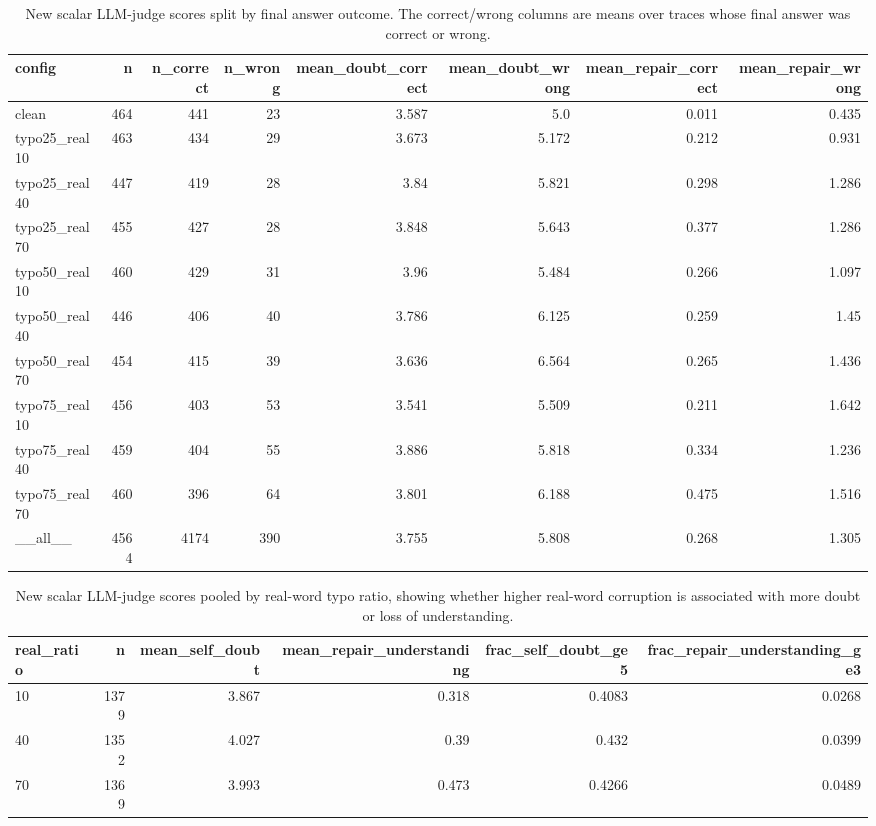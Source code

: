\documentclass[11pt]{article}
\begin{document}
\begin{table}[H]
\centering
\caption{New scalar LLM-judge scores split by final answer outcome. The correct/wrong columns are means over traces whose final answer was correct or wrong.}
\small
\begin{adjustbox}{max width=\textwidth}
\begin{tabular}{lrrrrrrr}
\toprule
\textbf{config} & \textbf{n} & \textbf{n\_correct} & \textbf{n\_wrong} & \textbf{mean\_doubt\_correct} & \textbf{mean\_doubt\_wrong} & \textbf{mean\_repair\_correct} & \textbf{mean\_repair\_wrong} \\
\midrule
clean & 464 & 441 & 23 & 3.587 & 5.0 & 0.011 & 0.435 \\
typo25\_real10 & 463 & 434 & 29 & 3.673 & 5.172 & 0.212 & 0.931 \\
typo25\_real40 & 447 & 419 & 28 & 3.84 & 5.821 & 0.298 & 1.286 \\
typo25\_real70 & 455 & 427 & 28 & 3.848 & 5.643 & 0.377 & 1.286 \\
typo50\_real10 & 460 & 429 & 31 & 3.96 & 5.484 & 0.266 & 1.097 \\
typo50\_real40 & 446 & 406 & 40 & 3.786 & 6.125 & 0.259 & 1.45 \\
typo50\_real70 & 454 & 415 & 39 & 3.636 & 6.564 & 0.265 & 1.436 \\
typo75\_real10 & 456 & 403 & 53 & 3.541 & 5.509 & 0.211 & 1.642 \\
typo75\_real40 & 459 & 404 & 55 & 3.886 & 5.818 & 0.334 & 1.236 \\
typo75\_real70 & 460 & 396 & 64 & 3.801 & 6.188 & 0.475 & 1.516 \\
\_\_all\_\_ & 4564 & 4174 & 390 & 3.755 & 5.808 & 0.268 & 1.305 \\
\bottomrule
\end{tabular}
\end{adjustbox}
\end{table}

\begin{table}[H]
\centering
\caption{New scalar LLM-judge scores pooled by real-word typo ratio, showing whether higher real-word corruption is associated with more doubt or loss of understanding.}
\small
\begin{adjustbox}{max width=\textwidth}
\begin{tabular}{lrrrrr}
\toprule
\textbf{real\_ratio} & \textbf{n} & \textbf{mean\_self\_doubt} & \textbf{mean\_repair\_understanding} & \textbf{frac\_self\_doubt\_ge5} & \textbf{frac\_repair\_understanding\_ge3} \\
\midrule
10 & 1379 & 3.867 & 0.318 & 0.4083 & 0.0268 \\
40 & 1352 & 4.027 & 0.39 & 0.432 & 0.0399 \\
70 & 1369 & 3.993 & 0.473 & 0.4266 & 0.0489 \\
\bottomrule
\end{tabular}
\end{adjustbox}
\end{table}
\end{document}
